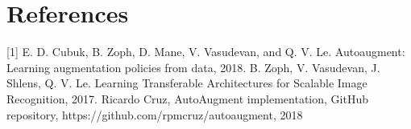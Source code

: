 \documentclass[10pt,twocolumn,letterpaper]{article}
\begin{document}
\section{References}

[1]  E. D. Cubuk, B. Zoph, D. Mane, V. Vasudevan, and Q. V. Le. Autoaugment:   Learning  augmentation  policies  from  data, 2018. \newline
[2] B. Zoph, V. Vasudevan, J. Shlens, Q. V. Le. Learning Transferable Architectures for Scalable Image Recognition, 2017. \newline
[3] Ricardo Cruz, AutoAugment implementation, GitHub repository, https://github.com/rpmcruz/autoaugment, 2018 \newline

{\small


}
\end{document}

